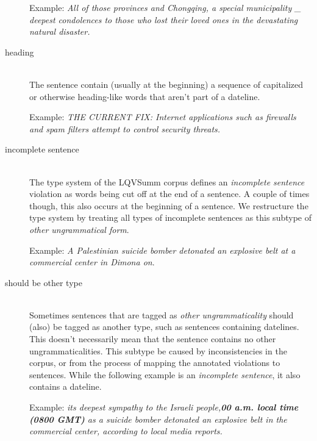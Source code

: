\documentclass[a4paper,10pt]{scrartcl}
\theoremstyle{style}
\begin{document}
\begin{description}
	Example: \textit{All of those provinces and Chongqing, a special municipality \_ deepest condolences to those who lost their loved ones in the devastating natural disaster.}

\item[heading] \hfill \\
	The sentence contain (usually at the beginning) a sequence of capitalized or otherwise heading-like words that aren't part of a dateline.

	Example: \textit{THE CURRENT FIX: Internet applications such as firewalls and spam filters attempt to control security threats.}

\item[incomplete sentence] \hfill \\
	The type system of the LQVSumm corpus \citep{valeeva} defines an \textit{incomplete sentence} violation as words being cut off at the end of a sentence. A couple of times though, this also occurs at the beginning of a sentence. We restructure the type system by treating all types of incomplete sentences as this subtype of \textit{other ungrammatical form}.

	Example: \textit{A Palestinian suicide bomber detonated an explosive belt at a \\commercial center in Dimona on}.
\item[should be other type] \hfill \\
	Sometimes sentences that are tagged as \textit{other ungrammaticality} should (also) be tagged as another type, such as sentences containing datelines. This doesn't necessarily mean that the sentence contains no other ungrammaticalities. This subtype be caused by inconsistencies in the corpus, or from the process of mapping the annotated violations to sentences. While the following example is an \textit{incomplete sentence}, it also contains a dateline.

	Example: \textit{its deepest sympathy to the Israeli people,\textbf{00 a.m. local time (0800 GMT)} as a suicide bomber detonated an explosive belt in the commercial center, according to local media reports.}
%


\end{description}
\end{document}
